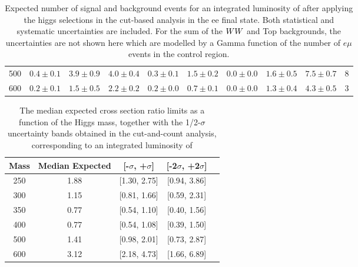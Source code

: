 \begin{table}[!ht]
{\begin{center}
\begin{tabular}{l | c c |  c c c c c c | c }
500 & $0.4\pm0.1$ & $3.9\pm0.9$ & $4.0\pm0.4$ & $0.3\pm0.1$ & $1.5\pm0.2$ & $0.0\pm0.0$ & $1.6\pm0.5$ & $7.5\pm0.7$ & 8 \\
600 & $0.2\pm0.1$ & $1.5\pm0.5$ & $2.2\pm0.2$ & $0.2\pm0.0$ & $0.7\pm0.1$ & $0.0\pm0.0$ & $1.3\pm0.4$ & $4.3\pm0.5$ & 3 \\
\hline\hline
\end{tabular}
\end{center}
}
\caption{Expected number of signal and background events for an integrated luminosity of \intlumi after applying the higgs selections 
  in the cut-based analysis in the ee final state. Both statistical and systematic uncertainties are included. For the sum of the $WW$ and Top backgrounds, the uncertainties are 
  not shown here which are modelled by a Gamma function of the number of $e\mu$ events in the control region.  }
\label{tab:yield_cutbased}
\end{table}

\begin{table}[!ht]
\begin{center}
\begin{tabular}{ccccc}
\hline\hline
Mass & Median Expected & [-$\sigma$, +$\sigma$] & [-2$\sigma$, +2$\sigma$]\\\hline
250 & 1.88 & [1.30, 2.75] & [0.94, 3.86] \\
300 & 1.15 & [0.81, 1.66] & [0.59, 2.31] \\
350 & 0.77 & [0.54, 1.10] & [0.40, 1.56] \\
400 & 0.77 & [0.54, 1.08] & [0.39, 1.50] \\
500 & 1.41 & [0.98, 2.01] & [0.73, 2.87] \\
600 & 3.12 & [2.18, 4.73] & [1.66, 6.89] \\
\hline\hline
\end{tabular}
\end{center}
\caption{The median expected cross section ratio limits as a function 
of the Higgs mass, together with the 1/2-$\sigma$ uncertainty bands obtained in the cut-and-count analysis, corresponding to 
an integrated luminosity of \intlumi}
\label{tab:limits_cutbased_4fb}
\end{table}
\clearpage
